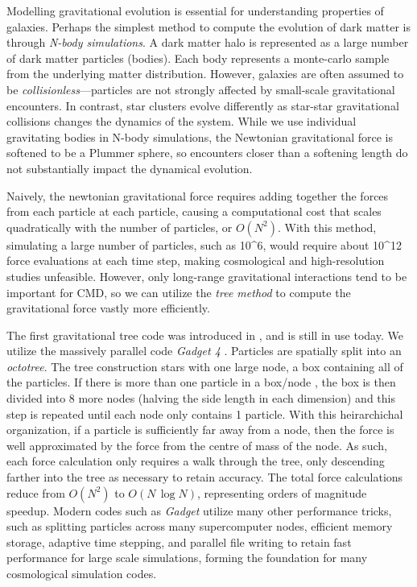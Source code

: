 Modelling gravitational evolution is essential for understanding
properties of galaxies. Perhaps the simplest method to compute the
evolution of dark matter is through \emph{N-body simulations}. A dark
matter halo is represented as a large number of dark matter particles
(bodies). Each body represents a monte-carlo sample from the underlying
matter distribution. However, galaxies are often assumed to be
\emph{collisionless}---particles are not strongly affected by
small-scale gravitational encounters. In contrast, star clusters evolve
differently as star-star gravitational collisions changes the dynamics
of the system. While we use individual gravitating bodies in N-body
simulations, the Newtonian gravitational force is softened to be a
Plummer sphere, so encounters closer than a softening length do not
substantially impact the dynamical evolution.

Naively, the newtonian gravitational force requires adding together the
forces from each particle at each particle, causing a computational cost
that scales quadratically with the number of particles, or \(O(N^2)\).
With this method, simulating a large number of particles, such as
10\^{}6, would require about 10\^{}12 force evaluations at each time
step, making cosmological and high-resolution studies unfeasible.
However, only long-range gravitational interactions tend to be important
for CMD, so we can utilize the \emph{tree method} to compute the
gravitational force vastly more efficiently.

The first gravitational tree code was introduced in
\citet{barnes+hut1986}, and is still in use today. We utilize the
massively parallel code \emph{Gadget 4} \citep{gadget4}. Particles are
spatially split into an \emph{octotree}. The tree construction stars
with one large node, a box containing all of the particles. If there is
more than one particle in a box/node , the box is then divided into 8
more nodes (halving the side length in each dimension) and this step is
repeated until each node only contains 1 particle. With this
heirarchichal organization, if a particle is sufficiently far away from
a node, then the force is well approximated by the force from the centre
of mass of the node. As such, each force calculation only requires a
walk through the tree, only descending farther into the tree as
necessary to retain accuracy. The total force calculations reduce from
\(O(N^2)\) to \(O(N\,\log N)\), representing orders of magnitude
speedup. Modern codes such as \emph{Gadget} utilize many other
performance tricks, such as splitting particles across many
supercomputer nodes, efficient memory storage, adaptive time stepping,
and parallel file writing to retain fast performance for large scale
simulations, forming the foundation for many cosmological simulation
codes.

